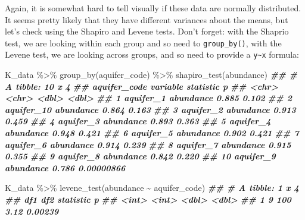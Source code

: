 \documentclass[
]{krantz}
\newenvironment{Shaded}{\begin{snugshade}}{\end{snugshade}}
\newcommand{\DocumentationTok}[1]{\textcolor[rgb]{0.56,0.35,0.01}{\textbf{\textit{#1}}}}
\newcommand{\FunctionTok}[1]{\textcolor[rgb]{0.00,0.00,0.00}{#1}}
\newcommand{\NormalTok}[1]{#1}
\newcommand{\SpecialCharTok}[1]{\textcolor[rgb]{0.00,0.00,0.00}{#1}}
\begin{document}
Again, it is somewhat hard to tell visually if these data are normally distributed. It seems pretty likely that they have different variances about the means, but let's check using the Shapiro and Levene tests. Don't forget: with the Shaprio test, we are looking within each group and so need to \texttt{group\_by()}, with the Levene test, we are looking across groups, and so need to provide a \texttt{y\textasciitilde{}x} formula:

\begin{Shaded}
\begin{Highlighting}[]
\NormalTok{K\_data }\SpecialCharTok{\%\textgreater{}\%}
  \FunctionTok{group\_by}\NormalTok{(aquifer\_code) }\SpecialCharTok{\%\textgreater{}\%} 
  \FunctionTok{shapiro\_test}\NormalTok{(abundance)}
\DocumentationTok{\#\# \# A tibble: 10 x 4}
\DocumentationTok{\#\#    aquifer\_code variable  statistic          p}
\DocumentationTok{\#\#    \textless{}chr\textgreater{}        \textless{}chr\textgreater{}         \textless{}dbl\textgreater{}      \textless{}dbl\textgreater{}}
\DocumentationTok{\#\#  1 aquifer\_1    abundance     0.885 0.102     }
\DocumentationTok{\#\#  2 aquifer\_10   abundance     0.864 0.163     }
\DocumentationTok{\#\#  3 aquifer\_2    abundance     0.913 0.459     }
\DocumentationTok{\#\#  4 aquifer\_3    abundance     0.893 0.363     }
\DocumentationTok{\#\#  5 aquifer\_4    abundance     0.948 0.421     }
\DocumentationTok{\#\#  6 aquifer\_5    abundance     0.902 0.421     }
\DocumentationTok{\#\#  7 aquifer\_6    abundance     0.914 0.239     }
\DocumentationTok{\#\#  8 aquifer\_7    abundance     0.915 0.355     }
\DocumentationTok{\#\#  9 aquifer\_8    abundance     0.842 0.220     }
\DocumentationTok{\#\# 10 aquifer\_9    abundance     0.786 0.00000866}
\end{Highlighting}
\end{Shaded}

\begin{Shaded}
\begin{Highlighting}[]
\NormalTok{K\_data }\SpecialCharTok{\%\textgreater{}\%}
  \FunctionTok{levene\_test}\NormalTok{(abundance }\SpecialCharTok{\textasciitilde{}}\NormalTok{ aquifer\_code)}
\DocumentationTok{\#\# \# A tibble: 1 x 4}
\DocumentationTok{\#\#     df1   df2 statistic       p}
\DocumentationTok{\#\#   \textless{}int\textgreater{} \textless{}int\textgreater{}     \textless{}dbl\textgreater{}   \textless{}dbl\textgreater{}}
\DocumentationTok{\#\# 1     9   100      3.12 0.00239}
\end{Highlighting}
\end{Shaded}
\end{document}
